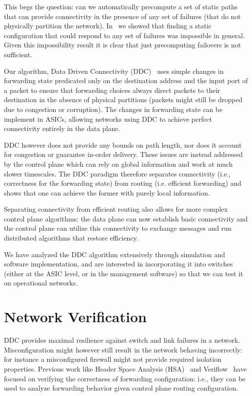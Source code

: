\documentclass[letterpaper]{article}
\begin{document}
This begs the question: can we automatically precompute a set of static paths that can provide connectivity in the
presence of any set of failures (that do not physically partition the network). In~\cite{feigenbaum12resilience} we
showed that finding a static configuration that could respond to any set of failures was impossible in general. Given
this impossibility result it is clear that just precomputing failovers is not sufficient.

Our algorithm, Data Driven Connectivity (DDC)~\cite{liu13ddc} uses simple changes in forwarding state predicated
only on the destination address and the input port of a packet to ensure that forwarding choices always direct packets
to their destination in the absence of physical partitions (packets might still be dropped due to congestion or
corruption). The changes in forwarding state can be implement in ASICs, allowing networks using DDC to achieve perfect
connectivity entirely in the data plane.

DDC however does not provide any bounds on path length, nor does it account for congestion or guarantee in-order
delivery. These issues are instead addressed by the control plane which can rely on global information and work at much
slower timescales. The DDC paradigm therefore separates connectivity (i.e., correctness for the forwarding state) from
routing (i.e. efficient forwarding) and shows that one can achieve the former with purely local information. 

Separating connectivity from efficient routing also allows for more complex control plane algorithms: the data
plane can now establish basic connectivity and the control plane can utilize this connectivity to exchange messages and
run distributed algorithms that restore efficiency.

We have analyzed the DDC algorithm extensively through simulation and software implementation, and are interested in incorporating it into switches (either at the ASIC level, or in the management software) so that we can test it on operational networks.

\section*{Network Verification}
DDC provides maximal resilience against switch and link failures in a network. Misconfiguration might however still result in
the network behaving incorrectly: for instance a misconfigured firewall might not provide required isolation properties.
Previous work like Header Space Analysis (HSA)~\cite{kazemian2012header} and Veriflow~\cite{khurshid13veriflow} have
focused on verifying the correctness of forwarding configuration: i.e., they can be used to analyze forwarding behavior
given control plane routing configuration.
\end{document}
